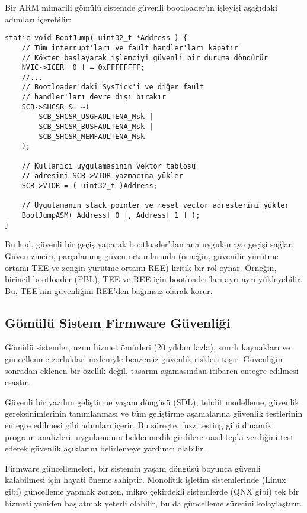 Bir ARM mimarili gömülü sistemde güvenli bootloader'ın işleyişi aşağıdaki adımları içerebilir:
\begin{verbatim}
static void BootJump( uint32_t *Address ) {
    // Tüm interrupt'ları ve fault handler'ları kapatır
    // Kökten başlayarak işlemciyi güvenli bir duruma döndürür
    NVIC->ICER[ 0 ] = 0xFFFFFFFF;
    //...
    // Bootloader'daki SysTick'i ve diğer fault
    // handler'ları devre dışı bırakır
    SCB->SHCSR &= ~(
        SCB_SHCSR_USGFAULTENA_Msk |
        SCB_SHCSR_BUSFAULTENA_Msk |
        SCB_SHCSR_MEMFAULTENA_Msk
    );

    // Kullanıcı uygulamasının vektör tablosu
    // adresini SCB->VTOR yazmacına yükler
    SCB->VTOR = ( uint32_t )Address;

    // Uygulamanın stack pointer ve reset vector adreslerini yükler
    BootJumpASM( Address[ 0 ], Address[ 1 ] );
}
\end{verbatim}
Bu kod, güvenli bir geçiş yaparak bootloader'dan ana uygulamaya geçişi sağlar. Güven zinciri, parçalanmış güven ortamlarında (örneğin, güvenilir yürütme ortamı TEE ve zengin yürütme ortamı REE) kritik bir rol oynar. Örneğin, birincil bootloader (PBL), TEE ve REE için bootloader'ları ayrı ayrı yükleyebilir. Bu, TEE'nin güvenliğini REE'den bağımsız olarak korur.

\subsection{Gömülü Sistem Firmware Güvenliği}

Gömülü sistemler, uzun hizmet ömürleri (20 yıldan fazla), sınırlı kaynakları ve güncellenme zorlukları nedeniyle benzersiz güvenlik riskleri taşır. Güvenliğin sonradan eklenen bir özellik değil, tasarım aşamasından itibaren entegre edilmesi esastır.

Güvenli bir yazılım geliştirme yaşam döngüsü (SDL), tehdit modelleme, güvenlik gereksinimlerinin tanımlanması ve tüm geliştirme aşamalarına güvenlik testlerinin entegre edilmesi gibi adımları içerir. Bu süreçte, fuzz testing gibi dinamik program analizleri, uygulamanın beklenmedik girdilere nasıl tepki verdiğini test ederek güvenlik açıklarını belirlemeye yardımcı olabilir.

Firmware güncellemeleri, bir sistemin yaşam döngüsü boyunca güvenli kalabilmesi için hayati öneme sahiptir. Monolitik işletim sistemlerinde (Linux gibi) güncelleme yapmak zorken, mikro çekirdekli sistemlerde (QNX gibi) tek bir hizmeti yeniden başlatmak yeterli olabilir, bu da güncelleme sürecini kolaylaştırır.

